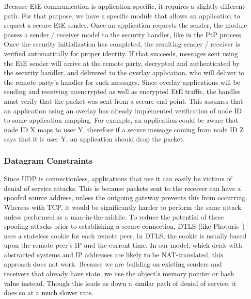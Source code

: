 \documentclass[conference]{IEEEtran}
\begin{document}
Because EtE communication is application-specific, it requires
a slightly different path.  For that purpose, we have a specific module that
allows an application to request a secure EtE sender.
Once an application requests the sender, the
module passes a sender / receiver model to the security handler, like in the PtP
process.  Once the security initialization has completed, the
resulting sender / receiver is verified automatically for proper identity.
If that succeeds, messages sent using the EtE sender will arrive at the remote
party, decrypted and authenticated by the security handler, and delivered to the
overlay application, who will deliver to the remote party's handler for such messages.
Since overlay applications will be sending and receiving
unencrypted as well as encrypted EtE traffic, the handler must verify that the
packet was sent from a secure end point.  This assumes that an application using
an overlay has already implemented verification of node ID to some application
mapping.  For example, an application could be aware that node ID X maps to user
Y, therefore if a secure message coming from node ID Z says that it is user Y,
an application should drop the packet.

\subsubsection{Datagram Constraints}
Since UDP is connectionless, applications that use it can easily be victims of
denial of service attacks.  This is because packets sent to the receiver can
have a spoofed source address, unless the outgoing gateway prevents this from
occurring.  Whereas with TCP, it would be significantly harder to perform the
same attack unless performed as a man-in-the-middle.  To reduce the potential
of these spoofing attacks prior to establishing a secure connection, DTLS (like
Photuris~\cite{photuris}) uses a stateless cookie for each remote peer.  In
DTLS, the cookie is usually based upon the remote peer's IP and the current
time.  In our model, which deals with abstracted systems and IP addresses are
likely to be NAT-translated, this approach does not work.  Because we are
building on existing senders and receivers that already have state, we use the
object's memory pointer or hash value instead.  Though this leads us down a
similar path of denial of service, it does so at a much slower rate.

\end{document}
